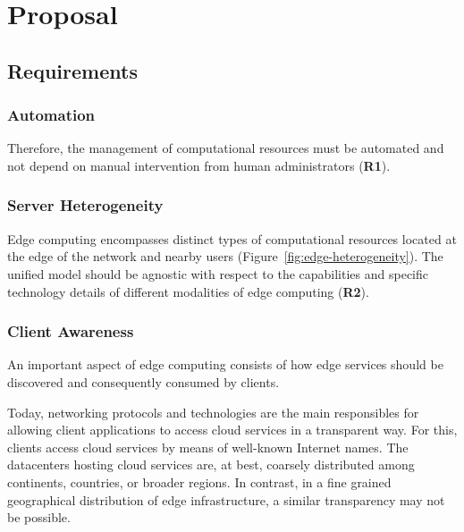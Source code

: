 \section{Proposal}\label{sec:proposal}

\subsection{Requirements}

\subsubsection{Automation}


Therefore, the management of computational resources must be automated and not depend on  manual intervention from human administrators (\textbf{R1}).


\subsubsection{Server Heterogeneity}

Edge computing encompasses distinct types of computational resources located at the edge of the network and nearby users (Figure~\ref{fig:edge-heterogeneity}). The unified model should be agnostic with respect to the capabilities and specific technology details of different modalities of edge computing (\textbf{R2}). 


\subsubsection{Client Awareness}

An important aspect of edge computing consists of how edge services should be discovered and consequently consumed by clients. 

Today, networking protocols and technologies are the main responsibles for allowing client applications to access cloud services in a transparent way. For this, clients access cloud services by means of well-known Internet names. The datacenters hosting cloud services are, at best, coarsely distributed among continents, countries, or broader regions. 
In contrast, in a fine grained geographical distribution of edge infrastructure, a similar transparency may not be possible. 

